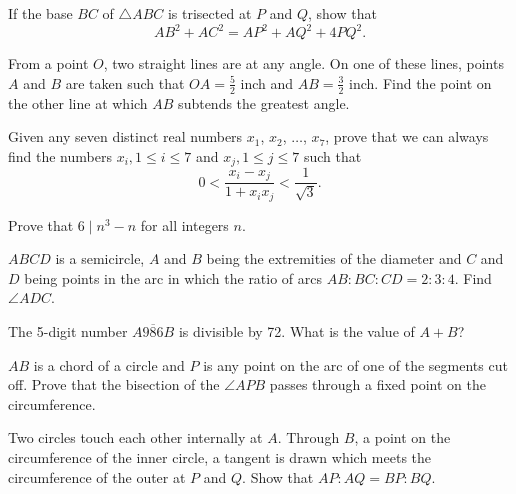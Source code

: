 \begin{problems}
    \problem If the base $BC$ of $\triangle ABC$ is trisected at $P$ and $Q$,
    show that 
    \[AB^2 + AC^2 = AP^2 + AQ^2 + 4PQ^2.\]

    \problem From a point $O$, two straight lines are at any angle. On one of
    these lines, points $A$ and $B$ are taken such that $OA = \frac{5}{2}$ inch
    and $AB = \frac{3}{2}$ inch. Find the point on the other line at which $AB$
    subtends the greatest angle.

    \problem Given any seven distinct real numbers $x_{1}$, $x_{2}$, $\ldots$,
    $x_{7}$, prove that we can always find the numbers $x_{i}, 1\leq i\leq 7$
    and $x_{j},1\leq j\leq 7$ such that 
    \[ 0 < \frac{x_{i} - x_{j}}{1 + x_{i}x_{j}} < \frac{1}{\sqrt{3}}. \]

    \problem Prove that $6 \mid n^3 - n$ for all integers $n$.

    \problem[error] $ABCD$ is a semicircle, $A$ and $B$ being the extremities of
    the diameter and $C$ and $D$ being points in the arc in which the ratio of
    arcs $AB : BC : CD = 2 : 3 : 4$. Find $\angle ADC$.

    \problem The 5-digit number $\overline{A986B}$ is divisible by 72. What is
    the value of $A + B$?

    \problem $AB$ is a chord of a circle and $P$ is any point on the arc of one
    of the segments cut off. Prove that the bisection of the $\angle APB$ passes
    through a fixed point on the circumference.

    \problem Two circles touch each other internally at $A$. Through $B$, a
    point on the circumference of the inner circle, a tangent is drawn which
    meets the circumference of the outer at $P$ and $Q$. Show that \mbox{$AP :
    AQ = BP : BQ$}.
\end{problems}
